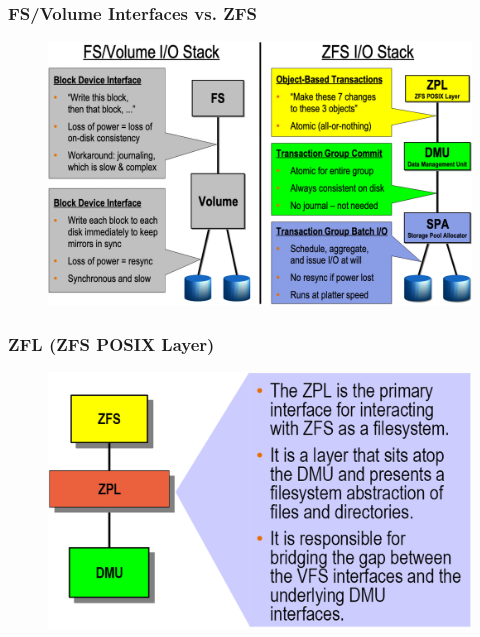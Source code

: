 % 
% 
% 
% 
\begin{frame}[fragile]
    \frametitle{FS/Volume Interfaces vs. ZFS}
    \begin{figure}
    \includegraphics[width=0.7\linewidth]{figs/ZFS-io-stack.png}
    \end{figure}
\end{frame}
% 
% 
% 
\begin{frame}[fragile]
    \frametitle{ZFL (ZFS POSIX Layer)}
    \begin{figure}
    \includegraphics[width=0.75\linewidth]{figs/ZFS-zpl.png}
    \end{figure}  
\end{frame}
